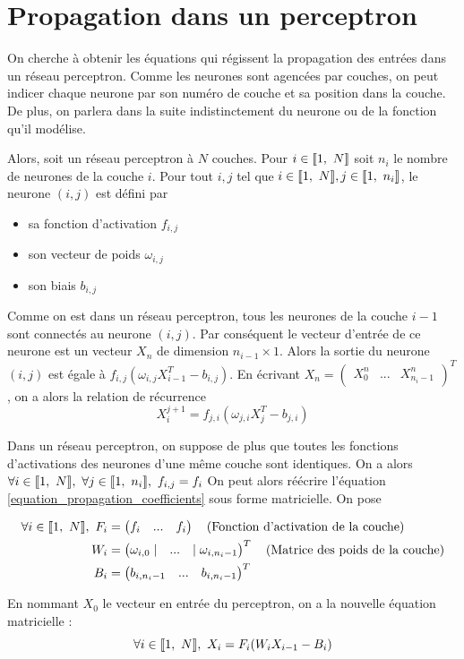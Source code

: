 \section{Propagation dans un perceptron}

On cherche à obtenir les équations qui régissent la propagation des entrées dans un réseau perceptron. Comme les neurones sont agencées par couches, on peut indicer chaque neurone par son numéro de couche et sa position dans la couche. De plus, on parlera dans la suite indistinctement du neurone ou de la fonction qu'il modélise. 

Alors, soit un réseau perceptron à $N$ couches. Pour $i \in \llbracket 1,\ N \rrbracket$ soit $n_i$ le nombre de neurones de la couche $i$. Pour tout $i,j $ tel que $i \in \llbracket 1,\ N \rrbracket, j \in \llbracket 1,\ n_i \rrbracket$, le neurone $(i,j)$ est défini par 
\begin{itemize}
  \item sa fonction d'activation $f_{i,j}$ 
  \item son vecteur de poids $\omega_{i,j}$
  \item son biais $b_{i,j}$
\end{itemize}

Comme on est dans un réseau perceptron, tous les neurones de la couche $i-1$ sont connectés au neurone $(i,j)$. Par conséquent le vecteur d'entrée de ce neurone est un vecteur $X_n$ de dimension $n_{i-1} \times 1$. Alors la sortie du neurone $(i,j)$ est égale à $f_{i,j}(\omega_{i,j}X_{i-1}^T - b_{i,j})$. En écrivant $X_n = \begin{pmatrix}X_0^n & ... & X_{n_i-1}^n\end{pmatrix}^T$, on a alors la relation de récurrence 
\begin{equation}
  X_i^{j+1} = f_{j,i}(\omega_{j,i}X_j^T - b_{j,i})
  \label{equation_propagation_coefficients}
\end{equation}

Dans un réseau perceptron, on suppose de plus que toutes les fonctions d'activations des neurones d'une même couche sont identiques. On a alors $\forall i \in \brackets{1,\ N},\ \forall j \in \brackets{1,\ n_i},\ f_{i,j} = f_i$
On peut alors réécrire l'équation \eqref{equation_propagation_coefficients} sous forme matricielle. On pose

\begin{align*}
\forall i \in \llbracket 1,\ N \rrbracket,\ F_i &= \begin{pmatrix} f_i & ... & f_i \end{pmatrix}\quad \text{(Fonction d'activation de la couche)}\\
                            W_i &= \begin{pmatrix} \omega_{i,0} \mid & ... & \mid \omega_{i, n_i-1}\end{pmatrix}^T \quad \text{(Matrice des poids de la couche)} \\
                            B_i &= \begin{pmatrix} b_{i, n_i-1} & ... & b_{i, n_i-1}\end{pmatrix}^T 
\end{align*}

En nommant $X_0$ le vecteur en entrée du perceptron, on a la nouvelle équation matricielle : 
\begin{equation}
  \forall i \in \brackets{1,\ N},\ X_i = F_i(W_i X_{i-1} - B_i) 
  \label{equation_propagation_matricielle}
\end{equation}
